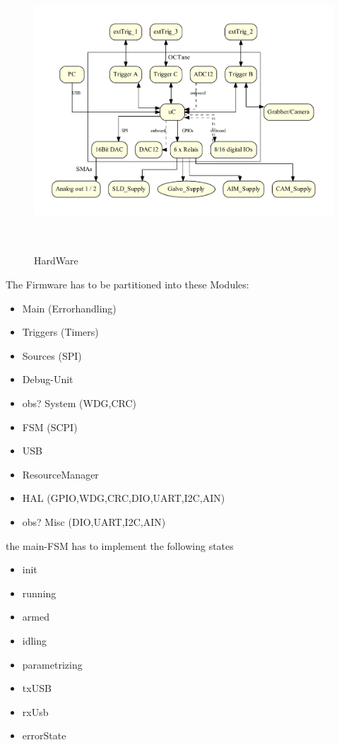 		\begin{figure}[ht]
			\centering
			\includegraphics[height=105mm]{src/_Octane_HW-Structure.pdf}
			\caption{HardWare}
			\label{_Octane_HW-Structure.pdf}
		\end{figure}


	{ The Firmware has to be partitioned into these Modules:
		\begin{itemize}
		\item Main (Errorhandling)
		\item Triggers	(Timers)
		\item Sources	(SPI)
		\item Debug-Unit
		\item obs? System (WDG,CRC) 
		\item FSM (SCPI) 
		\item USB
		\item ResourceManager
		\item HAL (GPIO,WDG,CRC,DIO,UART,I2C,AIN)
		\item obs? Misc	(DIO,UART,I2C,AIN)
		\end{itemize}
	}

	{	the main-FSM has to implement the following states
		\begin{itemize}
		\item init
		\item running
		\item armed
		\item idling
		\item parametrizing 
		\item txUSB
		\item rxUsb
		\item errorState
		\end{itemize}
	}

